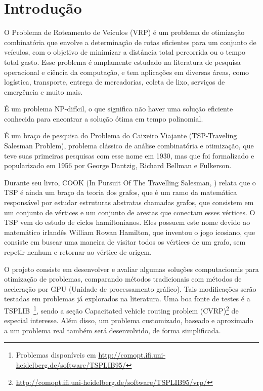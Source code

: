 \documentclass[
    openany,
    12pt,
    a4paper,
    twoside,
    english,
    brazil, sumario=tradicional
]{/home/lucas_galdino/Desktop/TCC/planning/abntex2/abntex2}
\begin{document}


\imprimirfolhaderosto*

\tableofcontents
\cleardoublepage

\cleardoublepage
\textual



\chapter{Introdução}

O Problema de Roteamento de Veículos (VRP) é um problema de otimização combinatória que envolve a determinação de rotas eficientes para um conjunto de veículos, com o objetivo de minimizar a distância total percorrida ou o tempo total gasto\@. Esse problema é amplamente estudado na literatura de pesquisa operacional e ciência da computação, e tem aplicações em diversas áreas, como logística, transporte, entrega de mercadorias, coleta de lixo, serviços de emergência e muito mais.

É um problema NP-difícil, o que significa não haver uma solução eficiente conhecida para encontrar a solução ótima em tempo polinomial. 

É um braço de pesquisa do Problema do Caixeiro Viajante (TSP-Traveling Salesman Problem), problema clássico de análise combinatória e otimização, que teve suas primeiras pesquisas com esse nome em 1930, mas que foi formalizado e popularizado em 1956 por George Dantzig, Richard Bellman e Fulkerson. 

Durante seu livro, COOK (In Pursuit Of The Travelling Salesman, \citeyear{pursuit_travelling_salesman}) relata que o TSP é ainda um braço da teoria dos grafos, que é um ramo da matemática responsável por estudar estruturas abstratas chamadas grafos, que consistem em um conjunto de vértices e um conjunto de arestas que conectam esses vértices. O TSP vem do estudo de ciclos hamiltonianos. Eles possuem este nome devido ao matemático irlandês William Rowan Hamilton, que inventou o jogo icosiano, que consiste em buscar uma maneira de visitar todos os vértices de um grafo, sem repetir nenhum e retornar ao vértice de origem.

O projeto consiste em desenvolver e avaliar algumas soluções computacionais para otimização de problemas, comparando métodos tradicionais com métodos de aceleração por GPU (Unidade de processamento gráfico). Tais modificações serão testadas em problemas já explorados na literatura. Uma boa fonte de testes é a TSPLIB~\cite{tsplib_ref}\footnote{Problemas disponíveis em \url{http://comopt.ifi.uni-heidelberg.de/software/TSPLIB95/}}, sendo a seção Capacitated vehicle routing problem (CVRP)\footnote{\url{http://comopt.ifi.uni-heidelberg.de/software/TSPLIB95/vrp/}} de especial interesse. Além disso, um problema customizado, baseado e aproximado a um problema real também será desenvolvido, de forma simplificada.
\end{document}
